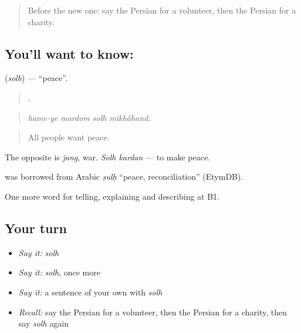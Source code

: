 \label{lesson:FA-C389-solh}



\begin{quote}
Before the new one: say the Persian for a volunteer, then the Persian for a charity.
\end{quote}

\subsection*{You'll want to know: }
\textbf{} (\emph{solh}) — \textquotedblleft{}peace\textquotedblright{}.

\begin{quote}
   .
\end{quote}

\begin{quote}
\emph{hame-ye mardom solh mikhâhand.}
\end{quote}

\begin{quote}
All people want peace.
\end{quote}

The opposite is \emph{jang}, war. \emph{Solh kardan} — to make peace.

\begin{cousinweb}
\textbf{} was borrowed from Arabic \emph{ṣulḥ} \textquotedblleft{}peace, reconciliation\textquotedblright{} (EtymDB).
\end{cousinweb}

\begin{grammarlens}[title={What you've built}]
One more word for telling, explaining and describing at B1.
\end{grammarlens}

\subsection*{Your turn}
\begin{itemize}
\raggedright
  \item \emph{Say it:} \emph{solh}
  \item \emph{Say it:} \emph{solh}, once more
  \item \emph{Say it:} a sentence of your own with \emph{solh}
  \item \emph{Recall:} say the Persian for a volunteer, then the Persian for a charity, then say \emph{solh} again
\end{itemize}

